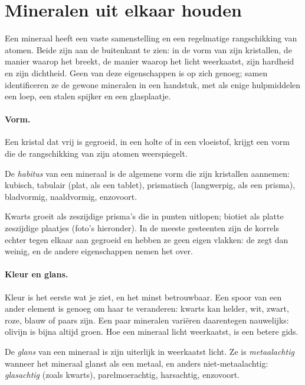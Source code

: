 \section{Mineralen uit elkaar houden}

Een mineraal heeft een vaste samenstelling en een regelmatige rangschikking van atomen. Beide
zijn aan de buitenkant te zien: in de vorm van zijn kristallen, de manier waarop het breekt, de
manier waarop het licht weerkaatst, zijn hardheid en zijn dichtheid. Geen van deze eigenschappen
is op zich genoeg; samen identificeren ze de gewone mineralen in een handstuk,
met als enige hulpmiddelen een loep, een stalen spijker en een glasplaatje.

\paragraph{Vorm.} Een kristal dat vrij is gegroeid, in een holte of in een vloeistof,
krijgt een vorm die de rangschikking van zijn atomen weerspiegelt.

\begin{definition}[Habitus]\label{def:g11:minerals:habit}
De \emph{habitus} van een mineraal is de algemene vorm
die zijn kristallen aannemen: kubisch, tabulair (plat, als een tablet), prismatisch
(langwerpig, als een prisma), bladvormig, naaldvormig, enzovoort.
\end{definition}

Kwarts groeit als zeszijdige prisma's die in punten uitlopen; biotiet als platte
zeszijdige plaatjes (foto's hieronder). In de meeste gesteenten zijn de korrels echter
tegen elkaar aan gegroeid en hebben ze geen eigen vlakken: de  zegt dan weinig,
en de andere eigenschappen nemen het over.

\paragraph{Kleur en glans.} Kleur is het eerste wat je ziet, en het
minst betrouwbaar. Een spoor van een ander element is genoeg om haar te veranderen: kwarts
kan helder, wit, zwart, roze, blauw of paars zijn. Een paar mineralen variëren
daarentegen nauwelijks: olivijn is bijna altijd groen. Hoe een mineraal
licht weerkaatst, is een betere gids.

\begin{definition}[Glans]\label{def:g11:minerals:lustre}
De \emph{glans} van een mineraal is zijn uiterlijk in weerkaatst
licht. Ze is \emph{metaalachtig} wanneer het mineraal glanst als een metaal, en
anders niet-metaalachtig: \emph{glasachtig} (zoals kwarts), parelmoerachtig,
harsachtig, enzovoort.
\end{definition}

